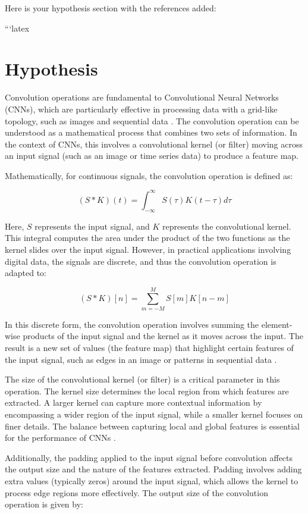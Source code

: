 Here is your hypothesis section with the references added:

```latex
\section{Hypothesis}

Convolution operations are fundamental to Convolutional Neural Networks (CNNs), which are particularly effective in processing data with a grid-like topology, such as images and sequential data \cite{courbariaux2016binarized} \cite{dai2021coatnet}. The convolution operation can be understood as a mathematical process that combines two sets of information. In the context of CNNs, this involves a convolutional kernel (or filter) moving across an input signal (such as an image or time series data) to produce a feature map.

Mathematically, for continuous signals, the convolution operation is defined as:

\[
(S * K)(t) = \int_{-\infty}^{\infty} S(\tau)K(t - \tau) d\tau
\]

Here, \(S\) represents the input signal, and \(K\) represents the convolutional kernel. This integral computes the area under the product of the two functions as the kernel slides over the input signal. However, in practical applications involving digital data, the signals are discrete, and thus the convolution operation is adapted to:

\[
(S * K)[n] = \sum_{m=-M}^{M} S[m]K[n - m]
\]

In this discrete form, the convolution operation involves summing the element-wise products of the input signal and the kernel as it moves across the input. The result is a new set of values (the feature map) that highlight certain features of the input signal, such as edges in an image or patterns in sequential data \cite{chen2019compressing}.

The size of the convolutional kernel (or filter) is a critical parameter in this operation. The kernel size determines the local region from which features are extracted. A larger kernel can capture more contextual information by encompassing a wider region of the input signal, while a smaller kernel focuses on finer details. The balance between capturing local and global features is essential for the performance of CNNs \cite{dai2016rfcn}.

Additionally, the padding applied to the input signal before convolution affects the output size and the nature of the features extracted. Padding involves adding extra values (typically zeros) around the input signal, which allows the kernel to process edge regions more effectively. The output size of the convolution operation is given by:

